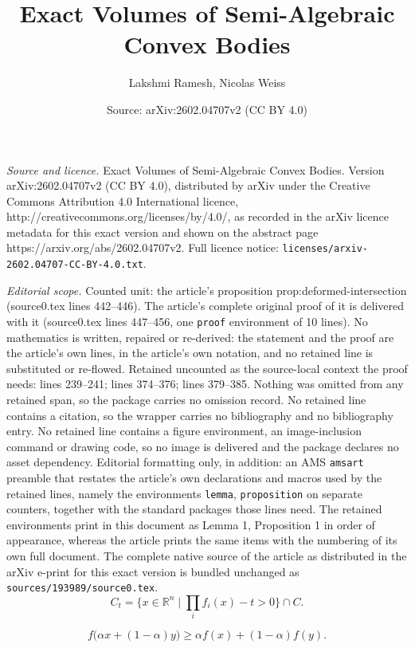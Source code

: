 \documentclass[10pt,a4paper]{amsart}
\title{Exact Volumes of Semi-Algebraic Convex Bodies}
\author{Lakshmi Ramesh, Nicolas Weiss}
\date{Source: arXiv:2602.04707v2 (CC BY 4.0)}
\begin{document}
\maketitle

\noindent\emph{Source and licence.} Exact Volumes of Semi-Algebraic Convex Bodies. Version arXiv:2602.04707v2 (CC BY 4.0), distributed by arXiv under the Creative Commons Attribution 4.0 International licence, http://creativecommons.org/licenses/by/4.0/, as recorded in the arXiv licence metadata for this exact version and shown on the abstract page https://arxiv.org/abs/2602.04707v2. Full licence notice: \texttt{licenses/arxiv-2602.04707-CC-BY-4.0.txt}.\par\smallskip

\noindent\textit{Editorial scope.} Counted unit: the article's proposition prop:deformed-intersection (source0.tex lines 442--446). The article's complete original proof of it is delivered with it (source0.tex lines 447--456, one \texttt{proof} environment of 10 lines). No mathematics is written, repaired or re-derived: the statement and the proof are the article's own lines, in the article's own notation, and no retained line is substituted or re-flowed.  Retained uncounted as the source-local context the proof needs: lines 239--241; lines 374--376; lines 379--385.  Nothing was omitted from any retained span, so the package carries no omission record.  No retained line contains a citation, so the wrapper carries no bibliography and no bibliography entry.  No retained line contains a figure environment, an image-inclusion command or drawing code, so no image is delivered and the package declares no asset dependency.  Editorial formatting only, in addition: an AMS \texttt{amsart} preamble that restates the article's own declarations and macros used by the retained lines, namely the environments \texttt{lemma}, \texttt{proposition} on separate counters, together with the standard packages those lines need.  The retained environments print in this document as Lemma 1, Proposition 1 in order of appearance, whereas the article prints the same items with the numbering of its own full document.  The complete native source of the article as distributed in the arXiv e-print for this exact version is bundled unchanged as \texttt{sources/193989/source0.tex}.
\begin{equation}\label{eq:deformed-intersection}
    C_t = \{x \in \mathbb R^n \mid \prod_i f_i(x) -t > 0 \} \cap C. 
\end{equation}

\begin{equation}\label{eqdef:concave}
    f\big(\alpha x + (1 - \alpha)y\big) \geq \alpha f(x) + (1-\alpha)f(y).
\end{equation}
\end{document}
